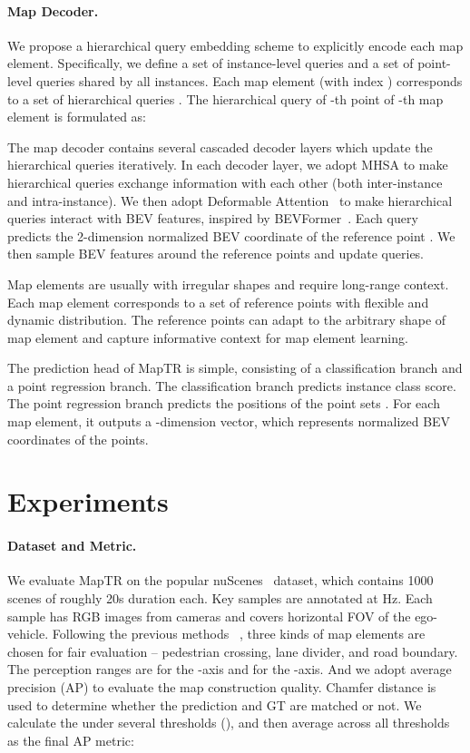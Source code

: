\documentclass{article} \usepackage{iclr2023_conference,times}
\begin{document}
\paragraph{Map Decoder.}
We propose a hierarchical query embedding scheme to explicitly encode each map element. Specifically, we define a set of instance-level queries  and a set of point-level queries  shared by all instances. 
Each map element (with index ) corresponds to a set of hierarchical queries .
The hierarchical query of -th point of -th map element is formulated as:



The map decoder contains several cascaded decoder layers which  update the hierarchical queries iteratively.
In each decoder layer, we adopt MHSA to make hierarchical queries exchange information with each other (both inter-instance and intra-instance).
We then adopt Deformable Attention~\citep{deformdetr} to make hierarchical queries  interact with BEV features, inspired by BEVFormer~\citep{bevformer}. 
Each query  predicts the 2-dimension normalized BEV coordinate  of the reference point . We then sample BEV features around the reference points and update queries.

Map elements are usually with irregular shapes and require long-range context. Each map element corresponds to a set of reference points  with flexible and dynamic distribution.
The reference points  can adapt to the arbitrary shape of map element and capture informative context for map element learning.


The prediction head of MapTR is simple, consisting of  a classification branch and  a point regression branch.
The classification branch predicts instance class score. The point regression branch predicts the positions of the point sets . For each map element, it outputs a -dimension vector, which represents normalized BEV coordinates  of the  points.




\section{Experiments}


\paragraph{Dataset and Metric.}
We evaluate  MapTR on the popular nuScenes~\citep{nuscenes} dataset, which contains 1000 scenes of roughly 20s duration each. Key samples are annotated at Hz. Each sample has RGB images from  cameras and covers  horizontal FOV of the ego-vehicle. 
Following the previous methods ~\citep{hdmapnet,vectormapnet}, three kinds of map elements are chosen for fair evaluation -- pedestrian crossing, lane divider, and road boundary. 
The perception ranges are  for the -axis and  for the -axis. And we adopt average precision (AP) to evaluate the map construction quality.
Chamfer distance  is used to determine whether the prediction and GT are matched or not.
We calculate the  under several  thresholds (), and then average across all thresholds as the final AP metric:
\end{document}
